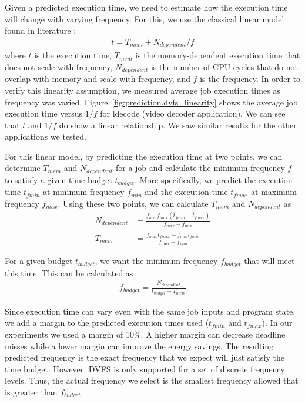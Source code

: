 Given a predicted execution time, we need to
estimate how the execution time will change with varying frequency. For this,
we use the classical linear model found in literature \cite{xie-pldi03, wu-micro05}:
\begin{align*}
  t = T_{mem} + N_{dependent}/f
\end{align*}
where $t$ is the execution time, $T_{mem}$ is the memory-dependent execution time
that does not scale with frequency, $N_{dependent}$ is the number of CPU cycles
that do not overlap with memory and scale with frequency, and $f$ is
the frequency.
In order to verify this linearity assumption, we measured average job execution
times as frequency was varied. Figure~\ref{fig:prediction.dvfs_linearity} shows
the average job execution time versus $1/f$ for ldecode (video decoder
application). We can see that $t$ and $1/f$ do show a linear relationship. We
saw similar results for the other applications we tested.

For this linear model, by predicting the execution time at two points, we can
determine $T_{mem}$ and $N_{dependent}$ 
for a job and calculate the minimum frequency $f$ to satisfy a
given time budget $t_{budget}$. More specifically, we predict the execution time
$\bar{t}_{fmin}$ at minimum frequency $f_{min}$ and the execution time
$\bar{t}_{fmax}$ at maximum frequency $f_{max}$. Using these two points, we can calculate $T_{mem}$ and $N_{dependent}$ as
\begin{align*}
  N_{dependent} &= \frac{f_{min}f_{max}(\bar{t}_{fmin} - \bar{t}_{fmax})}{f_{max} - f_{min}} \\
  T_{mem} &= \frac{f_{max}\bar{t}_{fmax} - f_{min}\bar{t}_{fmin}}{f_{max} - f_{min}}
\end{align*}

For a given budget $t_{budget}$, we want the minimum frequency $f_{budget}$ that will meet this time. This can be calculated as
\begin{align*}
  f_{budget} = \frac{N_{dependent}}{t_{budget} - T_{mem}}
\end{align*}

Since execution time can vary even with the same job inputs and program state, 
we add a margin to the predicted execution times used
($t_{fmin}$ and $t_{fmax}$). In our experiments we used a margin of 10\%. A
higher margin can decrease deadline misses while a lower margin can improve the
energy savings. 
The resulting predicted frequency is the exact frequency that we expect will just satisfy the
time budget. However, DVFS is only supported for a set of
discrete frequency levels. Thus, the actual frequency we select is the smallest
frequency allowed that is greater than $f_{budget}$. 

